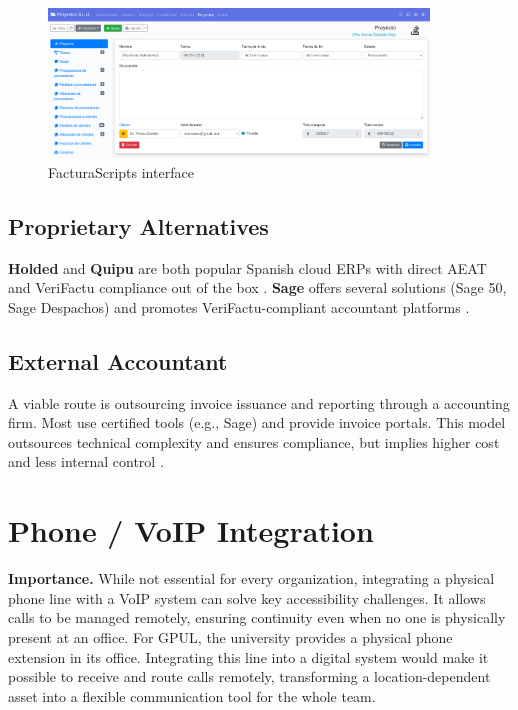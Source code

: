 \begin{figure}[H]
  \centering
  \includegraphics[width=0.9\textwidth]{imaxes/facturascripts-ui.png}
  \caption{FacturaScripts interface}
  \label{fig:facturascripts-ui}
\end{figure}

\subsection*{Proprietary Alternatives}

\textbf{Holded} and \textbf{Quipu} are both popular Spanish cloud ERPs with direct AEAT and VeriFactu compliance out of the box \cite{holded-verifactu}. \textbf{Sage} offers several solutions (Sage 50, Sage Despachos) and promotes VeriFactu-compliant accountant platforms \cite{sage-verifactu}.

\subsection*{External Accountant}
A viable route is outsourcing invoice issuance and reporting through a accounting firm. Most use certified tools (e.g., Sage) and provide invoice portals. This model outsources technical complexity and ensures compliance, but implies higher cost and less internal control \cite{sage-blog-asesoria}.

\section{Phone / VoIP Integration}

\textbf{Importance.} While not essential for every organization, integrating a physical phone line with a VoIP system can solve key accessibility challenges. It allows calls to be managed remotely, ensuring continuity even when no one is physically present at an office. For GPUL, the university provides a physical phone extension in its office. Integrating this line into a digital system would make it possible to receive and route calls remotely, transforming a location-dependent asset into a flexible communication tool for the whole team.

